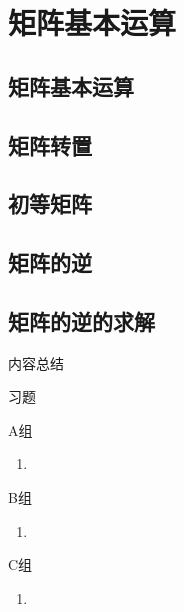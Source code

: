 \chapter{矩阵基本运算}

\section{矩阵基本运算}

\section{矩阵转置}

\section{初等矩阵}

\section{矩阵的逆}

\section{矩阵的逆的求解}

\vspace{2ex} 
\centerline{\heiti \Large 内容总结}

\vspace{2ex} 

\centerline{\heiti \Large 习题}
\vspace{2ex} 
{\kaishu }
\begin{flushright}
    \kaishu

\end{flushright}
\centerline{\heiti A组}
\begin{enumerate}
	\item 
\end{enumerate}
\centerline{\heiti B组}
\begin{enumerate}
	\item 
\end{enumerate}
\centerline{\heiti C组}
\begin{enumerate}
	\item 
\end{enumerate}